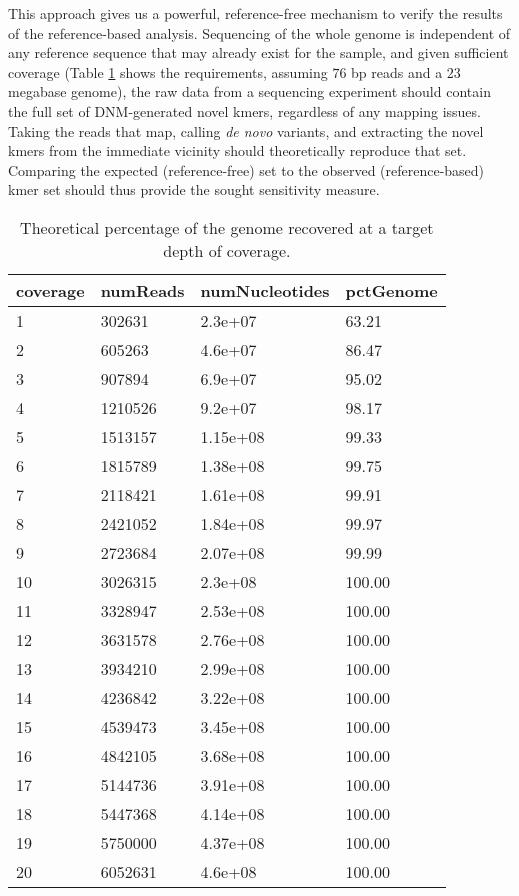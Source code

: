 This approach gives us a powerful, reference-free mechanism to verify the results of the reference-based analysis.  Sequencing of the whole genome is independent of any reference sequence that may already exist for the sample, and given sufficient coverage (Table \ref{tb:lw_cov} shows the requirements, assuming $76$ bp reads and a $23$ megabase genome), the raw data from a sequencing experiment should contain the full set of DNM-generated novel kmers, regardless of any mapping issues\cite{Lander:1988bp}.  Taking the reads that map, calling \textit{de novo} variants, and extracting the novel kmers from the immediate vicinity should theoretically reproduce that set.  Comparing the expected (reference-free) set to the observed (reference-based) kmer set should thus provide the sought sensitivity measure.

\begin{table}[]
\centering
\caption{Theoretical percentage of the genome recovered at a target depth of coverage.}
\label{tb:lw_cov}

\begin{tabular}{llll}
\toprule
coverage & numReads & numNucleotides & pctGenome\\
\midrule
1 & 302631 & 2.3e+07 & 63.21\\
2 & 605263 & 4.6e+07 & 86.47\\
3 & 907894 & 6.9e+07 & 95.02\\
4 & 1210526 & 9.2e+07 & 98.17\\
5 & 1513157 & 1.15e+08 & 99.33\\
6 & 1815789 & 1.38e+08 & 99.75\\
7 & 2118421 & 1.61e+08 & 99.91\\
8 & 2421052 & 1.84e+08 & 99.97\\
9 & 2723684 & 2.07e+08 & 99.99\\
10 & 3026315 & 2.3e+08 & 100.00\\
11 & 3328947 & 2.53e+08 & 100.00\\
12 & 3631578 & 2.76e+08 & 100.00\\
13 & 3934210 & 2.99e+08 & 100.00\\
14 & 4236842 & 3.22e+08 & 100.00\\
15 & 4539473 & 3.45e+08 & 100.00\\
16 & 4842105 & 3.68e+08 & 100.00\\
17 & 5144736 & 3.91e+08 & 100.00\\
18 & 5447368 & 4.14e+08 & 100.00\\
19 & 5750000 & 4.37e+08 & 100.00\\
20 & 6052631 & 4.6e+08 & 100.00\\
\bottomrule
\end{tabular}


\end{table}

